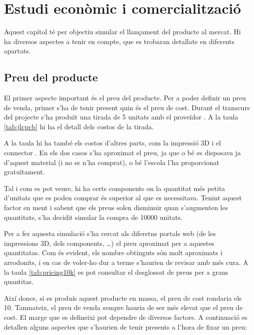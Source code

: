 \chapter{Estudi econòmic i comercialització}
\label{cap:economia}

Aquest capítol té per objectiu simular el llançament del producte al mercat.
Hi ha diversos aspectes a tenir en compte, que es trobaran detallats en
diferents apartats.

\section{Preu del producte}

El primer aspecte important és el preu del producte. Per a poder definir un
preu de venda, primer s'ha de tenir present quin és el preu de cost. Durant
el transcurs del projecte s'ha produït una tirada de 5 unitats amb el
proveïdor . A la taula \ref{tab:jlcpcb} hi ha el detall dels
costos de la tirada.



A la taula hi ha també els costos d'altres parts, com la impressió
3D i el connector . En els dos casos s'ha aproximat el preu, ja que
o bé es disposava ja d'aquest material (i no se n'ha comprat), o bé l'escola
l'ha proporcionat gratuïtament.

Tal i com es pot veure, hi ha certs components on la quantitat més petita
d'unitats que es poden comprar és superior al que es necessitava. Tenint aquest
factor en ment i sabent que els preus solen disminuir quan s'augmenten les
quantitats, s'ha decidit simular la compra de 10000 unitats.

Per a fer aquesta simulació s'ha cercat als diferetns portals web (de les
impressions 3D, dels components, \dots) el preu aproximat per a aquestes
quantitatas. Com és evident, els nombre obtinguts són molt aproximats i
arrodonits, i en cas de voler-ho dur a terme s'haurien de revisar amb més
cura. A la taula
\ref{tab:pricing10k} es pot consultar el desglossat de preus per a
grans quantitas.



Així doncs, si es produís aquest producte en massa, el preu de cost rondaria
els \SI[round-mode=places,round-precision=0]{10}{\EUR}.
Tanmateix, el preu de venda sempre hauria de ser més elevat que
el preu de cost. El marge que es defineixi pot dependre de diversos factors.
A continuació es detallen alguns aspectes que s'haurien de tenir presents
a l'hora de fixar un preu:

